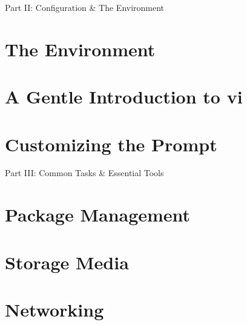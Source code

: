 \documentclass[oneside]{book}
\numberwithin{equation}{section}
\begin{document}
\begin{center}
	\huge Part II: Configuration \& The Environment
\end{center}

\section{The Environment}


\section{A Gentle Introduction to vi}


\section{Customizing the Prompt}


\begin{center}
	\huge Part III: Common Tasks \& Essential Tools
\end{center}


\section{Package Management}


\section{Storage Media}


\section{Networking}

\end{document}

